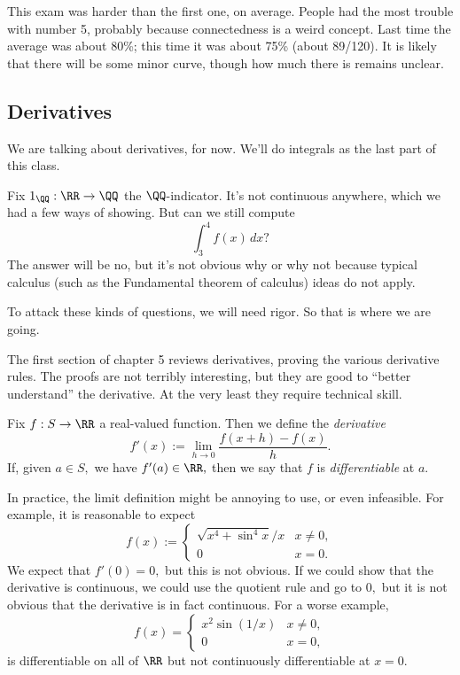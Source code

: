 \documentclass[../notes.tex]{subfiles}
\begin{document}
This exam was harder than the first one, on average. People had the most trouble with number 5, probably because connectedness is a weird concept. Last time the average was about 80\%; this time it was about 75\% (about 89/120). It is likely that there will be some minor curve, though how much there is remains unclear.

\subsection{Derivatives}
We are talking about derivatives, for now. We'll do integrals as the last part of this class.
\begin{ex}
	Fix $1_\QQ:\RR\to\QQ$ the $\QQ$-indicator. It's not continuous anywhere, which we had a few ways of showing. But can we still compute
	\[\int_3^4f(x)\,dx?\]
	The answer will be no, but it's not obvious why or why not because typical calculus (such as the Fundamental theorem of calculus) ideas do not apply.
\end{ex}
To attack these kinds of questions, we will need rigor. So that is where we are going.

The first section of chapter 5 reviews derivatives, proving the various derivative rules. The proofs are not terribly interesting, but they are good to ``better understand'' the derivative. At the very least they require technical skill.
\begin{definition}[Derivative]
	Fix $f:S\to\RR$ a real-valued function. Then we define the \textit{derivative}
	\[f'(x):=\lim_{h\to0}\frac{f(x+h)-f(x)}h.\]
	If, given $a\in S,$ we have $f'(a)\in\RR,$ then we say that $f$ is \textit{differentiable} at $a.$
\end{definition}
In practice, the limit definition might be annoying to use, or even infeasible. For example, it is reasonable to expect
\[f(x):=\begin{cases}
	\sqrt{x^4+\sin^4x}/x & x\ne0, \\
	0 & x=0.
\end{cases}\]
We expect that $f'(0)=0,$ but this is not obvious. If we could show that the derivative is continuous, we could use the quotient rule and go to $0,$ but it is not obvious that the derivative is in fact continuous. For a worse example,
\[f(x)=\begin{cases}
	x^2\sin(1/x) & x\ne0, \\
	0 & x=0,
\end{cases}\]
is differentiable on all of $\RR$ but not continuously differentiable at $x=0.$
\end{document}
